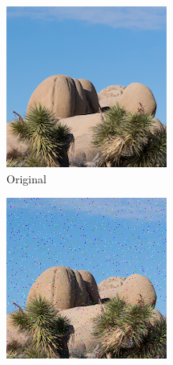 \documentclass{article}
\begin{document}
\begin{figure}
    \centering
    \begin{subfigure}[b]{0.32\textwidth}
        \centering
        \includegraphics[width=\textwidth]{../Resource/cropped-image.png}
        \caption{Original}
        \label{fig:cropped-image-hamming-bsc-original}
    \end{subfigure}
    \hfill
    \begin{subfigure}[b]{0.32\textwidth}
        \centering
        \includegraphics[width=\textwidth]{../Result/cropped-hamming-bsc-output.png}

\end{subfigure}
\end{figure}
\end{document}
